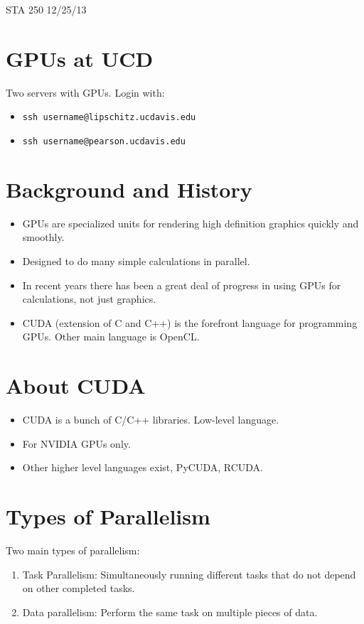 \documentclass[]{article}
\begin{document}
STA 250 \hfill 12/25/13

\section*{GPUs at UCD}
Two servers with GPUs.  Login with:
\begin{itemize}
\item \texttt{ssh username@lipschitz.ucdavis.edu}
\item \texttt{ssh username@pearson.ucdavis.edu}
\end{itemize}

\section*{Background and History}
\begin{itemize}
\item
GPUs are specialized units for rendering high definition graphics quickly and smoothly.
\item
Designed to do many simple calculations in parallel.
\item
In recent years there has been a great deal of progress in using GPUs for calculations, not just graphics.
\item
CUDA (extension of C and C++) is the forefront language for programming GPUs.  Other main language is OpenCL.
\end{itemize}

\section*{About CUDA}
\begin{itemize}
\item
CUDA is a bunch of C/C++ libraries.  Low-level language.
\item
For NVIDIA GPUs only.
\item
Other higher level languages exist, PyCUDA, RCUDA.
\end{itemize}

\section*{Types of Parallelism}
Two main types of parallelism:

\begin{enumerate}
\item
Task Parallelism:  Simultaneously running different tasks that do not depend on other completed tasks. 
\item
Data parallelism: Perform the same task on multiple pieces of data. 
\end{enumerate}
\end{document}
